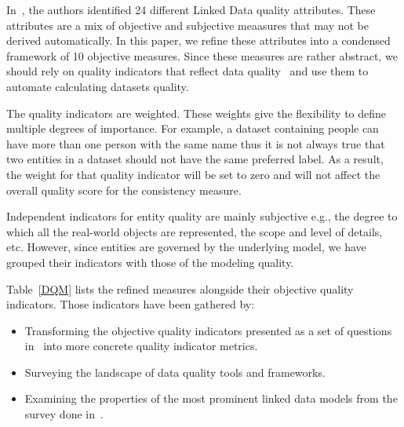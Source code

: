 \documentclass[onecolumn, crcready]{../../Util/LaTEX/iosart2c}
\begin{document}
In~\cite{Assaf:DQMST:12}, the authors identified 24 different Linked Data quality attributes. These attributes are a mix of objective and subjective meaasures that may not be derived automatically. In this paper, we refine these attributes into a condensed framework of 10 objective measures. Since these measures are rather abstract, we should rely on quality indicators that reflect data quality~\cite{Flemming:Thesis:10} and use them to automate calculating datasets quality.

The quality indicators are weighted. These weights give the flexibility to define multiple degrees of importance. For example, a dataset containing people can have more than one person with the same name thus it is not always true that two entities in a dataset should not have the same preferred label. As a result, the weight for that quality indicator will be set to zero and will not affect the overall quality score for the consistency measure.

Independent indicators for entity quality are mainly subjective e.g., the degree to which all the real-world objects are represented, the scope and level of details, etc. However, since entities are governed by the underlying model, we have grouped their indicators with those of the modeling quality.

Table~\ref{DQM} lists the refined measures alongside their objective quality indicators. Those indicators have been gathered by:

\begin{itemize}
	\item Transforming the objective quality indicators presented as a set of questions in~\cite{Assaf:DQMST:12} into more concrete quality indicator metrics.
	\item Surveying the landscape of data quality tools and frameworks.
	\item Examining the properties of the most prominent linked data models from the survey done in~\cite{Assaf:PROFILES:15}.
\end{itemize}
\end{document}
